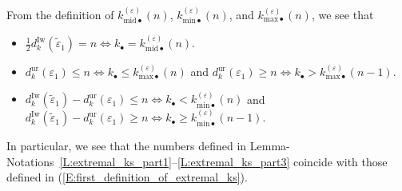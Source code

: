 \begin{remark}
    \label{R:meaning_of_kmidminmax}
    From the definition of $k_{\mathrm{mid}\bullet}^{(\varepsilon)}(n)$, $k_{\mathrm{min}\bullet}^{(\varepsilon)}(n)$, and $k^{(\varepsilon)}_{\mathrm{max} \bullet}(n)$, we see that
    \begin{itemize}
    \item $\frac 12d_k^{\mathrm{Iw}}(\tilde \varepsilon_1) = n \Leftrightarrow k_\bullet = k_{\mathrm{mid}\bullet}^{(\varepsilon)}(n)$.
    \item $d_k^{\mathrm{ur}}(\varepsilon_1) \leq  n \Leftrightarrow k_\bullet \leq k_{\mathrm{max}\bullet}^{(\varepsilon)}(n)$ and $d_k^{\mathrm{ur}}(\varepsilon_1) \geq   n \Leftrightarrow k_\bullet > k_{\mathrm{max}\bullet}^{(\varepsilon)}(n-1)$.
    \item
    $d_k^{\mathrm{Iw}}(\tilde \varepsilon_1) - d_k^{\mathrm{ur}}(\varepsilon_1) \leq  n \Leftrightarrow k_\bullet < k_{\mathrm{min}\bullet}^{(\varepsilon)}(n)$ and $d_k^{\mathrm{Iw}}(\tilde \varepsilon_1) -d_k^{\mathrm{ur}}(\varepsilon_1) \geq   n \Leftrightarrow k_\bullet \geq k_{\mathrm{min}\bullet}^{(\varepsilon)}(n-1)$.
    \end{itemize}
    In particular, we see that the numbers defined in Lemma-Notations~\ref{L:extremal_ks_part1}--\ref{L:extremal_ks_part3} coincide with those defined in (\ref{E:first_definition_of_extremal_ks}).
\end{remark}

